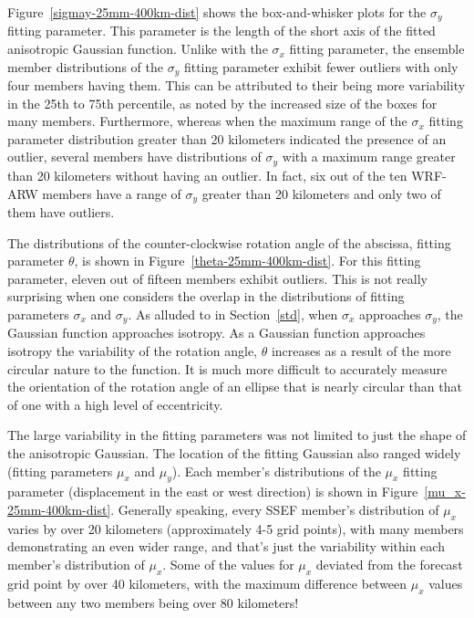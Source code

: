 \mbox{Figure \ref{sigmay-25mm-400km-dist}} shows the box-and-whisker plots for the $\sigma_y$ fitting parameter.
This parameter is the length of the short axis of the fitted anisotropic Gaussian function.
Unlike with the $\sigma_x$ fitting parameter, the ensemble member distributions of the $\sigma_y$ fitting parameter exhibit fewer outliers with only four members having them.
This can be attributed to their being more variability in the 25th to 75th percentile, as noted by the increased size of the boxes for many members.
Furthermore, whereas when the maximum range of the $\sigma_x$ fitting parameter distribution greater than 20 kilometers indicated the presence of an outlier, several members have distributions of $\sigma_y$ with a maximum range greater than 20 kilometers without having an outlier.
In fact, six out of the ten WRF-ARW members have a range of $\sigma_y$ greater than 20 kilometers and only two of them have outliers.


The distributions of the counter-clockwise rotation angle of the abscissa, fitting parameter $\theta$, is shown in \mbox{Figure \ref{theta-25mm-400km-dist}}.
For this fitting parameter, eleven out of fifteen members exhibit outliers.
This is not really surprising when one considers the overlap in the distributions of fitting parameters $\sigma_x$ and $\sigma_y$.
As alluded to in \mbox{Section \ref{std}}, when $\sigma_x$ approaches $\sigma_y$, the Gaussian function approaches isotropy.
As a Gaussian function approaches isotropy the variability of the rotation angle, $\theta$ increases as a result of the more circular nature to the function.
It is much more difficult to accurately measure the orientation of the rotation angle of an ellipse that is nearly circular than that of one with a high level of eccentricity.


The large variability in the fitting parameters was not limited to just the shape of the anisotropic Gaussian.
The location of the fitting Gaussian also ranged widely (fitting parameters $\mu_x$ and $\mu_y$).
Each member's distributions of the $\mu_x$ fitting parameter (displacement in the east or west direction) is shown in \mbox{Figure \ref{mu_x-25mm-400km-dist}}.
Generally speaking, every SSEF member's distribution of $\mu_x$ varies by over 20 kilometers (approximately 4-5 grid points), with many members demonstrating an even wider range, and that's just the variability within each member's distribution of $\mu_x$.
Some of the values for $\mu_x$ deviated from the forecast grid point by over 40 kilometers, with the maximum difference between $\mu_x$ values between any two members being over 80 kilometers!


